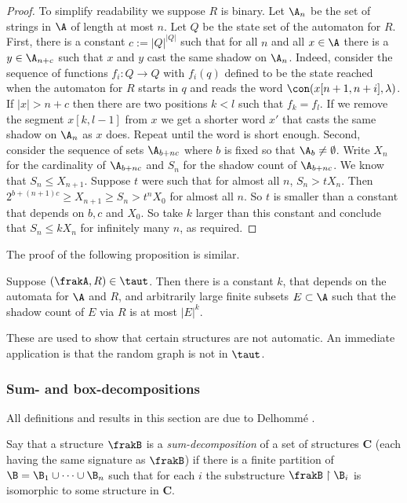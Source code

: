 \begin{proof} To simplify readability we suppose $R$ is binary.
Let $\A_n$ be the set of strings in ${\A}$ of length at most $n$. Let $Q$ be the state set of the automaton for $R$. 
First,  there is a constant $c := |Q|^{|Q|}$ such that for all $n$ and all $x \in {\A}$ there is a 
$y \in \A_{n+c}$ such that $x$ and $y$ cast the same shadow on $\A_n$. Indeed, consider the sequence of functions $f_i:Q \to Q$
with $f_i(q)$ defined to be the state reached when the automaton for $R$ starts in $q$ and reads the
word $\con(x[n+1,n+i],\lambda)$.  If $|x| > n + c$ then there are two positions  $k < l$ such that $f_k = f_l$. If we remove the segment $x[k,l-1]$ from $x$ we
get a shorter word $x'$ that casts the same shadow on $\A_n$ as $x$ does. Repeat until the word is short enough.
Second, consider the sequence of sets
$\A_{b+nc}$ where $b$ is fixed so that $\A_b \neq \emptyset$. Write $X_n$ for the cardinality of $\A_{b+nc}$ and $S_n$ for the shadow count of $\A_{b+nc}$. 
We know that $S_n \leq X_{n+1}$. Suppose $t$ were such that for almost all $n$, $S_n > t X_n$.  Then $2^{b+(n+1)c} \geq X_{n+1} \geq S_n > t^n X_0$ for almost all $n$. So  $t$ is smaller than a constant that depends on $b,c$ and $X_0$. So take $k$ larger than this constant and conclude that $S_n \leq k X_n$ for infinitely many $n$, as required.
\end{proof}

The proof of the following proposition is similar.
\begin{proposition}
Suppose $(\frakA,R) \in \taut$.
Then there is a constant $k$, 
that depends on the automata for $\A$ and $R$, and arbitrarily large finite subsets $E \subset {\A}$ such
that the shadow count of $E$ via $R$  is at most $|E|^k$.
\end{proposition}

These are used to show that certain structures are not automatic. An immediate application is that the random graph is not in $\taut$.

\subsubsection*{Sum- and box-decompositions}

All definitions and results in this section are due to Delhomm\'e \cite{Delh04}.
\begin{definition} 
Say that a structure $\frakB$ is a {\em sum-decomposition} of a set of structures
$\mathbf{C}$ (each having the same signature as $\frakB$) if there is a finite partition of $\B
= \B_1 \cup \cdots \cup \B_n$ such that for each $i$ the substructure $\frakB
\restriction \B_i$ is isomorphic to some structure in $\mathbf{C}$.
\end{definition}

